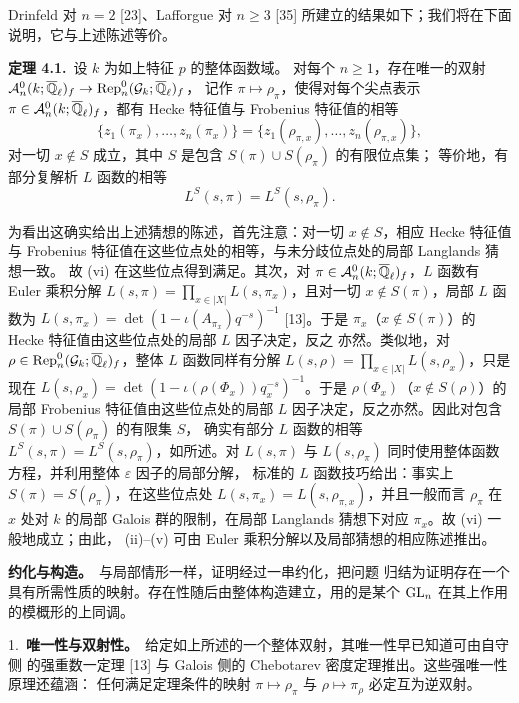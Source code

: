 Drinfeld 对 $n=2$ [23]、Lafforgue 对 $n\ge3$ [35] 所建立的结果如下；我们将在下面
说明，它与上述陈述等价。

\par\medskip\noindent\textbf{定理 4.1.}\ 设 $k$ 为如上特征 $p$ 的整体函数域。
对每个 $n\ge1$，存在唯一的双射
$\mathcal{A}_n^0(k;\overline{\mathbb{Q}}_\ell)_f\to\operatorname{Rep}_n^0(\mathcal{G}_k;\overline{\mathbb{Q}}_\ell)_f$，
记作 $\pi\mapsto\rho_\pi$，使得对每个尖点表示
$\pi\in\mathcal{A}_n^0(k;\overline{\mathbb{Q}}_\ell)_f$，都有 Hecke 特征值与 Frobenius 特征值的相等
\[
  \{z_1(\pi_x),\dots,z_n(\pi_x)\}
  =\{z_1(\rho_{\pi,x}),\dots,z_n(\rho_{\pi,x})\},
\]
对一切 $x\notin S$ 成立，其中 $S$ 是包含 $S(\pi)\cup S(\rho_\pi)$ 的有限位点集；
等价地，有部分复解析 $L$ 函数的相等
\[
  L^S(s,\pi)=L^S(s,\rho_\pi).
\]
\par\medskip

为看出这确实给出上述猜想的陈述，首先注意：对一切 $x\notin S$，相应 Hecke 特征值与
Frobenius 特征值在这些位点处的相等，与未分歧位点处的局部 Langlands 猜想一致。
故 (vi) 在这些位点得到满足。其次，对
$\pi\in\mathcal{A}_n^0(k;\overline{\mathbb{Q}}_\ell)_f$，$L$ 函数有 Euler 乘积分解
$L(s,\pi)=\prod_{x\in|X|}L(s,\pi_x)$，且对一切 $x\notin S(\pi)$，局部 $L$ 函数为
$L(s,\pi_x)=\det(1-\iota(A_{\pi_x})q^{-s})^{-1}$ [13]。于是
$\pi_x$（$x\notin S(\pi)$）的 Hecke 特征值由这些位点处的局部 $L$ 因子决定，反之
亦然。类似地，对 $\rho\in\operatorname{Rep}_n^0(\mathcal{G}_k;\overline{\mathbb{Q}}_\ell)_f$，整体
$L$ 函数同样有分解 $L(s,\rho)=\prod_{x\in|X|}L(s,\rho_x)$，只是现在
$L(s,\rho_x)=\det(1-\iota(\rho(\Phi_x))q_x^{-s})^{-1}$。于是
$\rho(\Phi_x)$（$x\notin S(\rho)$）的局部 Frobenius 特征值由这些位点处的局部
$L$ 因子决定，反之亦然。因此对包含 $S(\pi)\cup S(\rho_\pi)$ 的有限集 $S$，
确实有部分 $L$ 函数的相等 $L^S(s,\pi)=L^S(s,\rho_\pi)$，如所述。对 $L(s,\pi)$
与 $L(s,\rho_\pi)$ 同时使用整体函数方程，并利用整体 $\varepsilon$ 因子的局部分解，
标准的 $L$ 函数技巧给出：事实上 $S(\pi)=S(\rho_\pi)$，在这些位点处
$L(s,\pi_x)=L(s,\rho_{\pi,x})$，并且一般而言 $\rho_\pi$ 在 $x$ 处对 $k$ 的局部
Galois 群的限制，在局部 Langlands 猜想下对应 $\pi_x$。故 (vi) 一般地成立；由此，
(ii)--(v) 可由 Euler 乘积分解以及局部猜想的相应陈述推出。

\par\medskip\noindent\textbf{约化与构造。}\ 与局部情形一样，证明经过一串约化，把问题
归结为证明存在一个具有所需性质的映射。存在性随后由整体构造建立，用的是某个
$\mathrm{GL}_n$ 在其上作用的模概形的上同调。

1.~\textbf{唯一性与双射性。}\ 给定如上所述的一个整体双射，其唯一性早已知道可由自守侧
的强重数一定理 [13] 与 Galois 侧的 Chebotarev 密度定理推出。这些强唯一性原理还蕴涵：
任何满足定理条件的映射 $\pi\mapsto\rho_\pi$ 与 $\rho\mapsto\pi_\rho$ 必定互为逆双射。

